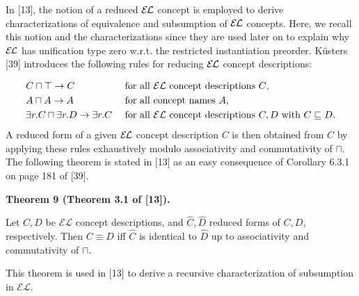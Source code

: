 In [13], the notion of a reduced $\mathcal{E\mkern-1.618muL}$ concept is employed to derive characterizations of equivalence and subsumption of $\mathcal{E\mkern-1.618muL}$ concepts. Here, we recall this notion and the characterizations since they are used later on to explain why $\mathcal{E\mkern-1.618muL}$ has unification type zero w.r.t. the restricted instantiation preorder. Küsters [39] introduces the following rules for reducing $\mathcal{E\mkern-1.618muL}$ concept descriptions:\par
    \[\begin{array}[]{l@{\ \ \ \ }l}C\sqcap\top\rightarrow C&\mbox{for all $\mathcal%
{EL}$ concept descriptions $C$},\\[3.00003pt]
A\sqcap A\rightarrow A&\mbox{for all concept names $A$},\\[3.00003pt]
\exists r.C\sqcap\exists r.D\rightarrow\exists r.C&\mbox{for all $\mathcal{EL}%
$ concept descriptions $C,D$
with $C\sqsubseteq D$}.\end{array}\]    
A reduced form of a given $\mathcal{E\mkern-1.618muL}$ concept description $C$ is then obtained from $C$ by applying these rules exhaustively modulo associativity and commutativity of $\sqcap$. The following theorem is stated in [13] as an easy consequence of Corollary 6.3.1 on page 181 of [39].\par
 
 
 
\par\medskip\noindent\textbf{Theorem 9 (Theorem 3.1 of [13]).}\par
 
 
Let $C,D$ be $\mathcal{EL}$ concept descriptions, and $\widehat{C},\widehat{D}$ reduced forms of $C,D$, respectively. Then $C\equiv D$ iff $\widehat{C}$ is identical to $\widehat{D}$ up to associativity and commutativity of $\sqcap$.\par
 
 
 
 
This theorem is used in [13] to derive a recursive characterization of subsumption in $\mathcal{EL}$.\par
 
 
 
